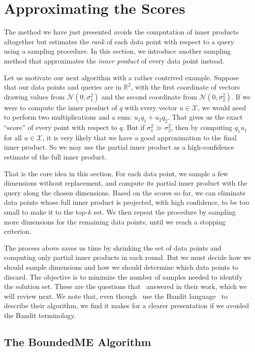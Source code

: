\section{Approximating the Scores}
The method we have just presented avoids the computation of inner products altogether
but estimates the \emph{rank} of each data point with respect to a query using a sampling procedure.
In this section, we introduce another sampling method that approximates the \emph{inner product}
of every data point instead.

Let us motivate our next algorithm with a rather contrived example.
Suppose that our data points and queries are in $\mathbb{R}^2$, with the first
coordinate of vectors drawing values from $\mathcal{N}(0, \sigma_1^2)$
and the second coordinate from $\mathcal{N}(0, \sigma_2^2)$.
If we were to compute the inner product of $q$ with every vector $u \in \mathcal{X}$,
we would need to perform two multiplications and a sum: $u_1q_1 + u_2q_2$.
That gives us the exact ``score'' of every point with respect to $q$.
But if $\sigma_1^2 \gg \sigma_2^2$, then by computing $q_1u_1$ for all $u \in \mathcal{X}$,
it is very likely that we have a good approximation to the 
final inner product. So we may use the partial inner product as a high-confidence
estimate of the full inner product.

That is the core idea in this section. For each data point,
we sample a few dimensions without replacement,
and compute its partial inner product with the query along the chosen dimensions.
Based on the scores so far, we can eliminate data points whose full inner product
is projected, with high confidence, to be too small to make it to the top-$k$ set.
We then repeat the procedure by sampling
more dimensions for the remaining data points, until we reach a stopping criterion.

The process above saves us time by shrinking the set of data points
and computing only partial inner products in each round. But we must decide
how we should sample dimensions and how we should determine which data points to discard.
The objective is to minimize the number of samples needed to identify the solution set.
These are the questions that~\cite{Liu2019banditMIPS} answered in their work,
which we will review next. We note that, even though~\cite{Liu2019banditMIPS}
use the Bandit language~\citep{lattimore2020BanditAlgorithms} to
describe their algorithm, we find it makes for a 
clearer presentation if we avoided the Bandit terminology.

\subsection{The BoundedME Algorithm}

